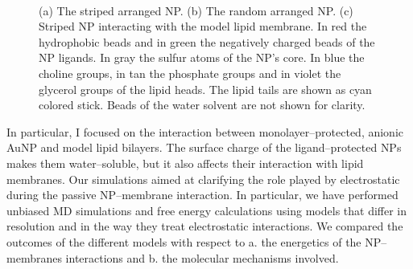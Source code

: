 \begin{figure}[!ht]
	\center
	\qquad\qquad\qquad%
	\\%
	\caption{(a) The striped arranged \acs{NP}. (b) The random arranged \acs{NP}. (c) Striped \acs{NP} interacting with the model lipid membrane. In red the hydrophobic beads and in green the negatively charged beads of the \acs{NP} ligands. In gray the sulfur atoms of the \acs{NP}'s core. In blue the choline groups, in tan the phosphate groups and in violet the glycerol groups of the lipid heads. The lipid tails are shown as cyan colored stick. Beads of the water solvent are not shown for clarity.}%
	\label{fig:NPSummary}
\end{figure}

In particular, I focused on the interaction between monolayer--protected, anionic \ac{AuNP} and model lipid 
bilayers. The surface charge of the ligand--protected \ac{NP}s makes them water--soluble, but it also affects their 
interaction with lipid membranes. Our simulations aimed at clarifying the role played by electrostatic during the 
passive \ac{NP}--membrane interaction. In particular, we have performed unbiased \ac{MD} simulations and free 
energy calculations using models that differ in resolution and in the way they treat electrostatic interactions. We 
compared the outcomes of the different models with respect to a. the energetics of the \ac{NP}--membranes 
interactions and b. the molecular mechanisms involved.

